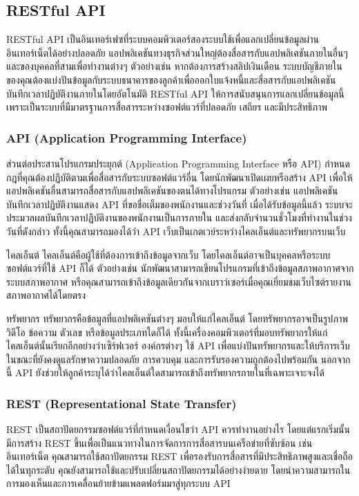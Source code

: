 \subsection{RESTful API}
RESTful API \cite{web:RESTful} เป็นอินเทอร์เฟซที่ระบบคอมพิวเตอร์สองระบบใช้เพื่อแลกเปลี่ยนข้อมูลผ่านอินเทอร์เน็ตได้อย่างปลอดภัย แอปพลิเคชันทางธุรกิจส่วนใหญ่ต้องสื่อสารกับแอปพลิเคชันภายในอื่นๆ และของบุคคลที่สามเพื่อทำงานต่างๆ ตัวอย่างเช่น หากต้องการสร้างสลิปเงินเดือน ระบบบัญชีภายในของคุณต้องแบ่งปันข้อมูลกับระบบธนาคารของลูกค้าเพื่อออกใบแจ้งหนี้และสื่อสารกับแอปพลิเคชันบันทึกเวลาปฏิบัติงานภายในโดยอัตโนมัติ RESTful API ให้การสนับสนุนการแลกเปลี่ยนข้อมูลนี้เพราะเป็นระบบที่มีมาตรฐานการสื่อสารระหว่างซอฟต์แวร์ที่ปลอดภัย เสถียร และมีประสิทธิภาพ
\subsubsection{API (Application Programming Interface)}
ส่วนต่อประสานโปรแกรมประยุกต์ (Application Programming Interface หรือ API) กำหนดกฎที่คุณต้องปฏิบัติตามเพื่อสื่อสารกับระบบซอฟต์แวร์อื่น โดยนักพัฒนาเปิดเผยหรือสร้าง API เพื่อให้แอปพลิเคชันอื่นสามารถสื่อสารกับแอปพลิเคชันของตนได้ทางโปรแกรม ตัวอย่างเช่น แอปพลิเคชันบันทึกเวลาปฏิบัติงานแสดง API ที่ขอชื่อเต็มของพนักงานและช่วงวันที่ เมื่อได้รับข้อมูลนี้แล้ว ระบบจะประมวลผลบันทึกเวลาปฏิบัติงานของพนักงานเป็นการภายใน และส่งกลับจำนวนชั่วโมงที่ทำงานในช่วงวันที่ดังกล่าว
ทั้งนี้คุณสามารถมองได้ว่า API เว็บเป็นเกตเวย์ระหว่างไคลเอ็นต์และทรัพยากรบนเว็บ

ไคลเอ็นต์
ไคลเอ็นต์คือผู้ใช้ที่ต้องการเข้าถึงข้อมูลจากเว็บ โดยไคลเอ็นต์อาจเป็นบุคคลหรือระบบซอฟต์แวร์ที่ใช้ API ก็ได้ ตัวอย่างเช่น นักพัฒนาสามารถเขียนโปรแกรมที่เข้าถึงข้อมูลสภาพอากาศจากระบบสภาพอากาศ หรือคุณสามารถเข้าถึงข้อมูลเดียวกันจากเบราว์เซอร์เมื่อคุณเยี่ยมชมเว็บไซต์รายงานสภาพอากาศได้โดยตรง

ทรัพยากร
ทรัพยากรคือข้อมูลที่แอปพลิเคชันต่างๆ มอบให้แก่ไคลเอ็นต์ โดยทรัพยากรอาจเป็นรูปภาพ วิดีโอ ข้อความ ตัวเลข หรือข้อมูลประเภทใดก็ได้ ทั้งนี้เครื่องคอมพิวเตอร์ที่มอบทรัพยากรให้แก่ไคลเอ็นต์นั้นเรียกอีกอย่างว่าเซิร์ฟเวอร์ องค์กรต่างๆ ใช้ API เพื่อแบ่งปันทรัพยากรและให้บริการเว็บในขณะที่ยังคงดูแลรักษาความปลอดภัย การควบคุม และการรับรองความถูกต้องไปพร้อมกัน นอกจากนี้ API ยังช่วยให้ลูกค้าระบุได้ว่าไคลเอ็นต์ใดสามารถเข้าถึงทรัพยากรภายในที่เฉพาะเจาะจงได้
\subsubsection{REST (Representational State Transfer)}
REST เป็นสถาปัตยกรรมซอฟต์แวร์ที่กำหนดเงื่อนไขว่า API ควรทำงานอย่างไร โดยแต่แรกเริ่มนั้น มีการสร้าง REST ขึ้นเพื่อเป็นแนวทางในการจัดการการสื่อสารบนเครือข่ายที่ซับซ้อน เช่น อินเทอร์เน็ต คุณสามารถใช้สถาปัตยกรรม REST เพื่อรองรับการสื่อสารที่มีประสิทธิภาพสูงและเชื่อถือได้ในทุกระดับ คุณยังสามารถใช้และปรับเปลี่ยนสถาปัตยกรรมได้อย่างง่ายดาย โดยนำความสามารถในการมองเห็นและการเคลื่อนย้ายข้ามแพลตฟอร์มมาสู่ทุกระบบ API

